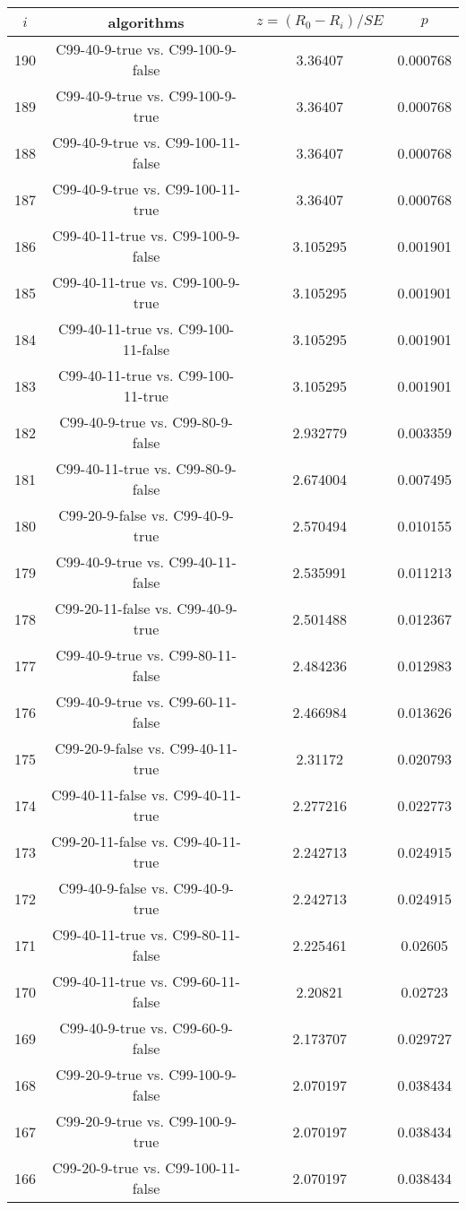 \documentclass[a4paper,10pt]{article}
\begin{document}
\begin{landscape}
\begin{table}[!htp]
\centering\scriptsize
\begin{tabular}{cccc}
$i$&algorithms&$z=(R_0 - R_i)/SE$&$p$\\
\hline190&C99-40-9-true vs. C99-100-9-false&3.36407&0.000768\\
189&C99-40-9-true vs. C99-100-9-true&3.36407&0.000768\\
188&C99-40-9-true vs. C99-100-11-false&3.36407&0.000768\\
187&C99-40-9-true vs. C99-100-11-true&3.36407&0.000768\\
186&C99-40-11-true vs. C99-100-9-false&3.105295&0.001901\\
185&C99-40-11-true vs. C99-100-9-true&3.105295&0.001901\\
184&C99-40-11-true vs. C99-100-11-false&3.105295&0.001901\\
183&C99-40-11-true vs. C99-100-11-true&3.105295&0.001901\\
182&C99-40-9-true vs. C99-80-9-false&2.932779&0.003359\\
181&C99-40-11-true vs. C99-80-9-false&2.674004&0.007495\\
180&C99-20-9-false vs. C99-40-9-true&2.570494&0.010155\\
179&C99-40-9-true vs. C99-40-11-false&2.535991&0.011213\\
178&C99-20-11-false vs. C99-40-9-true&2.501488&0.012367\\
177&C99-40-9-true vs. C99-80-11-false&2.484236&0.012983\\
176&C99-40-9-true vs. C99-60-11-false&2.466984&0.013626\\
175&C99-20-9-false vs. C99-40-11-true&2.31172&0.020793\\
174&C99-40-11-false vs. C99-40-11-true&2.277216&0.022773\\
173&C99-20-11-false vs. C99-40-11-true&2.242713&0.024915\\
172&C99-40-9-false vs. C99-40-9-true&2.242713&0.024915\\
171&C99-40-11-true vs. C99-80-11-false&2.225461&0.02605\\
170&C99-40-11-true vs. C99-60-11-false&2.20821&0.02723\\
169&C99-40-9-true vs. C99-60-9-false&2.173707&0.029727\\
168&C99-20-9-true vs. C99-100-9-false&2.070197&0.038434\\
167&C99-20-9-true vs. C99-100-9-true&2.070197&0.038434\\
166&C99-20-9-true vs. C99-100-11-false&2.070197&0.038434\\

\end{tabular}
\end{table}
\end{landscape}
\end{document}
